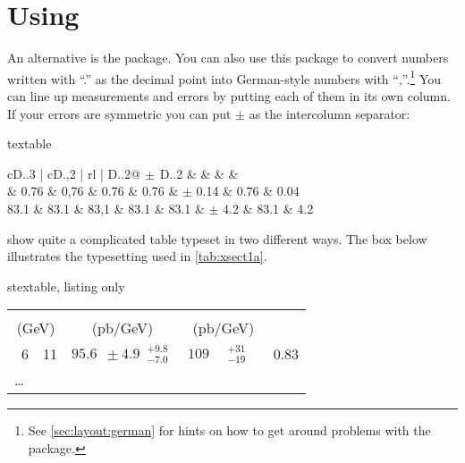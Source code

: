 \section{Using }%
\label{sec:tab:dcolumn}

An alternative is the  package. You can also use this
package to convert numbers written with \enquote{.} as the decimal point
into German-style numbers with \enquote{,}.\footnote{See
  \cref{sec:layout:german} for hints on how to get
  around problems with the  package.}
You can line up measurements and errors by putting each of them in its own column. If
your errors are symmetric you can put \(\pm\) as the intercolumn
separator:

\begin{tcblisting}{textable}
\centering
\begin{tabular}{cD{.}{.}{3} | cD{.}{,}{2} | rl |
  D{.}{.}{2}@{\(\,\pm\,\)}D{.}{.}{2}}
   &
   &
   &
   & \\
   & 0.76 & 0,76 & 0.76 & 0.76 & \(\pm\) 0.14 & 0.76 & 0.04\\
  83.1 & 83.1 & 83,1 & 83.1 & 83.1 & \(\pm\) 4.2  & 83.1 & 4.2
\end{tabular}
\end{tcblisting}

 show quite a complicated table
typeset in two different ways.
The box below illustrates the typesetting used in \cref{tab:xsect1a}.

\begin{tcblisting}{stextable, listing only}
\centering
\begin{tabular}{r@{ : }l|c|c|c}
  \toprule
  \multicolumn{2}{c|}{\pTjet} & \diffptb & \diffnloptb & \Cbhad \\
  \multicolumn{2}{c|}{(GeV)} & (pb/GeV) & (pb/GeV) & \\
  \midrule
  \(\phantom{1}\)6 & 11 &
  \(95.6\phantom{2} \pm 4.9\phantom{4}^{+9.8\phantom{2}}_{-7.0\phantom{2}}\) &
  \(109\phantom{.22}^{+31\phantom{.22}}_{-19\phantom{.22}}\) & 0.83 \\
  \multicolumn{5}{l}{\ldots}
\end{tabular}
\end{tcblisting}

